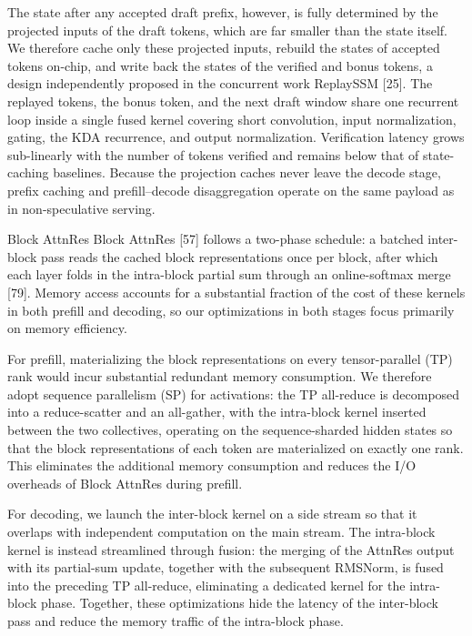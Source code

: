 \documentclass[
  10
]{article}
\begin{document}
The state after any accepted draft prefix, however, is fully determined
by the projected inputs of the draft tokens, which are far smaller than
the state itself. We therefore cache only these projected inputs,
rebuild the states of accepted tokens on-chip, and write back the states
of the verified and bonus tokens, a design independently proposed in the
concurrent work ReplaySSM {[}25{]}. The replayed tokens, the bonus
token, and the next draft window share one recurrent loop inside a
single fused kernel covering short convolution, input normalization,
gating, the KDA recurrence, and output normalization. Verification
latency grows sub-linearly with the number of tokens verified and
remains below that of state-caching baselines. Because the projection
caches never leave the decode stage, prefix caching and prefill--decode
disaggregation operate on the same payload as in non-speculative
serving.

Block AttnRes Block AttnRes {[}57{]} follows a two-phase schedule: a
batched inter-block pass reads the cached block representations once per
block, after which each layer folds in the intra-block partial sum
through an online-softmax merge {[}79{]}. Memory access accounts for a
substantial fraction of the cost of these kernels in both prefill and
decoding, so our optimizations in both stages focus primarily on memory
efficiency.

For prefill, materializing the block representations on every
tensor-parallel (TP) rank would incur substantial redundant memory
consumption. We therefore adopt sequence parallelism (SP) for
activations: the TP all-reduce is decomposed into a reduce-scatter and
an all-gather, with the intra-block kernel inserted between the two
collectives, operating on the sequence-sharded hidden states so that the
block representations of each token are materialized on exactly one
rank. This eliminates the additional memory consumption and reduces the
I/O overheads of Block AttnRes during prefill.

For decoding, we launch the inter-block kernel on a side stream so that
it overlaps with independent computation on the main stream. The
intra-block kernel is instead streamlined through fusion: the merging of
the AttnRes output with its partial-sum update, together with the
subsequent RMSNorm, is fused into the preceding TP all-reduce,
eliminating a dedicated kernel for the intra-block phase. Together,
these optimizations hide the latency of the inter-block pass and reduce
the memory traffic of the intra-block phase.
\end{document}
